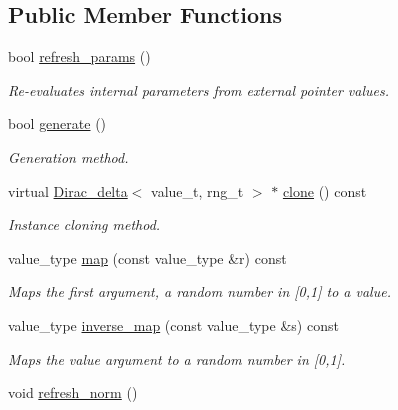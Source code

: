 \subsection*{Public Member Functions}
\begin{DoxyCompactItemize}
\item 
bool \hyperlink{a00128_af65c7c209cecd81bb1ba2467274d93d5}{refresh\+\_\+params} ()
\begin{DoxyCompactList}\small\item\em Re-\/evaluates internal parameters from external pointer values. \end{DoxyCompactList}\item 
\hypertarget{a00128_a59d3743064b415831c92af47498cb257}{}bool \hyperlink{a00128_a59d3743064b415831c92af47498cb257}{generate} ()\label{a00128_a59d3743064b415831c92af47498cb257}

\begin{DoxyCompactList}\small\item\em Generation method. \end{DoxyCompactList}\item 
virtual \hyperlink{a00128}{Dirac\+\_\+delta}$<$ value\+\_\+t, rng\+\_\+t $>$ $\ast$ \hyperlink{a00128_a641603a439c2b37ea33a17b62db26c1e}{clone} () const 
\begin{DoxyCompactList}\small\item\em Instance cloning method. \end{DoxyCompactList}\item 
\hypertarget{a00128_aa26dcdd91604d9065fd491e64d74c51b}{}value\+\_\+type \hyperlink{a00128_aa26dcdd91604d9065fd491e64d74c51b}{map} (const value\+\_\+type \&r) const \label{a00128_aa26dcdd91604d9065fd491e64d74c51b}

\begin{DoxyCompactList}\small\item\em Maps the first argument, a random number in \mbox{[}0,1\mbox{]} to a value. \end{DoxyCompactList}\item 
\hypertarget{a00128_a59c0cd0ecc744ccf8fc8df4248e1eb26}{}value\+\_\+type \hyperlink{a00128_a59c0cd0ecc744ccf8fc8df4248e1eb26}{inverse\+\_\+map} (const value\+\_\+type \&s) const \label{a00128_a59c0cd0ecc744ccf8fc8df4248e1eb26}

\begin{DoxyCompactList}\small\item\em Maps the value argument to a random number in \mbox{[}0,1\mbox{]}. \end{DoxyCompactList}\item 
\hypertarget{a00128_ad83492c980f6628c49e54c471cb95bbe}{}void \hyperlink{a00128_ad83492c980f6628c49e54c471cb95bbe}{refresh\+\_\+norm} ()\label{a00128_ad83492c980f6628c49e54c471cb95bbe}


\end{DoxyCompactItemize}

